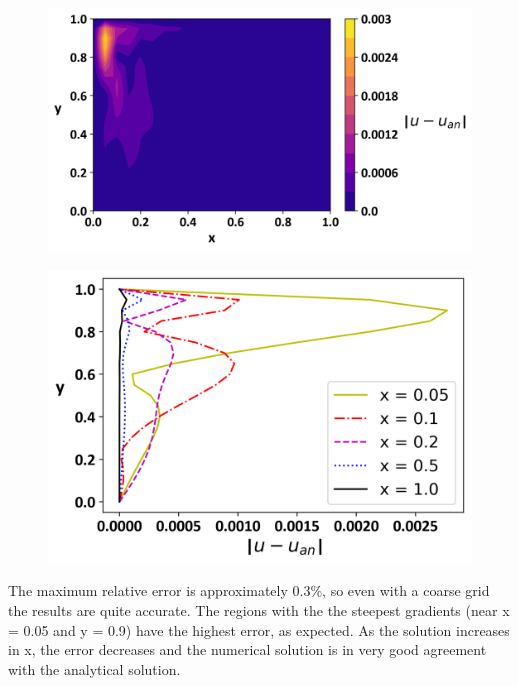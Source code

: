 \documentclass[10pt]{article}
\begin{document}
\begin{figure}[H]
\centering
\begin{minipage}{.49\textwidth}
  \centering
  \includegraphics[width=1\linewidth]{err_contour21_21.png}
  \captionsetup{width=.95\linewidth}
  \label{err_contour21}
\end{minipage}
\begin{minipage}{.49\textwidth}
  \centering
  \includegraphics[width=.8\linewidth]{err_curves21_21.png}
  \captionsetup{width=.95\linewidth}
  \label{err_curves21}
\end{minipage}
\end{figure}

The maximum relative error is approximately 0.3\%, so even with a coarse grid the results are quite accurate. The regions with the the steepest gradients (near x = 0.05 and y = 0.9) have the highest error, as expected. As the solution increases in x, the error decreases and the numerical solution is in very good agreement with the analytical solution.
\end{document}
